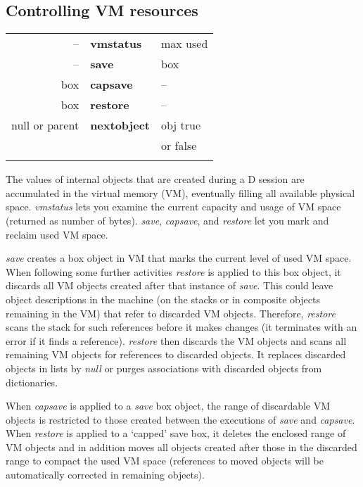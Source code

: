 \subsection{Controlling VM resources}

\begin{tabular}{>{\sffamily}r>{\sffamily\bfseries}l>{\sffamily}l}
-- & vmstatus & max used\\
-- & save & box\\
box & capsave & --\\
box & restore & --\\
null or parent & nextobject & obj true\\
            &            & or false\\\\
\end{tabular} 


The  values of internal objects that are created during a D  session  are accumulated  in  the  virtual memory (VM),  eventually  filling  all  available physical space. \emph{vmstatus} lets you examine the current capacity and usage of VM space (returned as number of bytes). \emph{save}, \emph{capsave}, and \emph{restore} let you mark and reclaim used VM space.

\emph{save} creates a box object in VM that marks the current level of used VM space. When following some further activities \emph{restore} is applied to this box object, it discards all VM objects created after that instance of \emph{save}. This could leave object descriptions in the machine (on the stacks or in composite objects remaining in the VM) that refer to discarded VM objects. Therefore, \emph{restore} scans the stack for such references before it makes changes (it terminates with an error if it finds a reference). \emph{restore} then discards the VM objects and scans all remaining VM objects for references to discarded objects. It replaces discarded objects in lists by \emph{null} or purges associations with discarded objects from dictionaries.

When \emph{capsave} is applied to a \emph{save} box object, the range of discardable VM objects is restricted to those created between the executions of \emph{save} and \emph{capsave}. When \emph{restore} is applied to a `capped' save box, it deletes the enclosed range of VM objects and in addition moves all objects created after those in the discarded range to compact the used VM space (references to moved objects will be automatically corrected in remaining objects).


